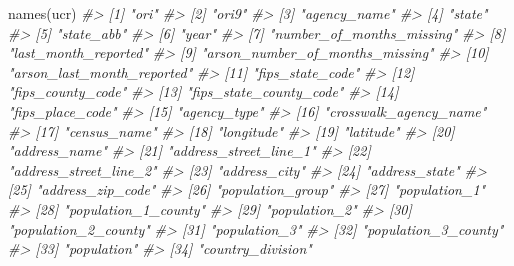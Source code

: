 \documentclass[
]{krantz}
\makeatletter
\newenvironment{Shaded}{\begin{snugshade}}{\end{snugshade}}
\newcommand{\CommentTok}[1]{\textcolor[rgb]{0.37,0.37,0.37}{\textit{#1}}}
\newcommand{\FunctionTok}[1]{\textcolor[rgb]{0,0,0}{#1}}
\newcommand{\NormalTok}[1]{#1}
\newenvironment{kframe}{%
\medskip{}
\setlength{\fboxsep}{.8em}
 \def\at@end@of@kframe{}%
 \ifinner\ifhmode%
  \def\at@end@of@kframe{\end{minipage}}%
  \begin{minipage}{\columnwidth}%
 \fi\fi%
 \def\FrameCommand##1{\hskip\@totalleftmargin \hskip-\fboxsep
 \colorbox{shadecolor}{##1}\hskip-\fboxsep
     \hskip-\linewidth \hskip-\@totalleftmargin \hskip\columnwidth}%
 \MakeFramed {\advance\hsize-\width
   \@totalleftmargin\z@ \linewidth\hsize
   \@setminipage}}%
 {\par\unskip\endMakeFramed%
 \at@end@of@kframe}
\renewenvironment{Shaded}{\begin{kframe}}{\end{kframe}}
\makeatother
\begin{document}
\begin{Shaded}
\begin{Highlighting}[]
\FunctionTok{names}\NormalTok{(ucr)}
\CommentTok{\#\textgreater{}   [1] "ori"                             }
\CommentTok{\#\textgreater{}   [2] "ori9"                            }
\CommentTok{\#\textgreater{}   [3] "agency\_name"                     }
\CommentTok{\#\textgreater{}   [4] "state"                           }
\CommentTok{\#\textgreater{}   [5] "state\_abb"                       }
\CommentTok{\#\textgreater{}   [6] "year"                            }
\CommentTok{\#\textgreater{}   [7] "number\_of\_months\_missing"        }
\CommentTok{\#\textgreater{}   [8] "last\_month\_reported"             }
\CommentTok{\#\textgreater{}   [9] "arson\_number\_of\_months\_missing"  }
\CommentTok{\#\textgreater{}  [10] "arson\_last\_month\_reported"       }
\CommentTok{\#\textgreater{}  [11] "fips\_state\_code"                 }
\CommentTok{\#\textgreater{}  [12] "fips\_county\_code"                }
\CommentTok{\#\textgreater{}  [13] "fips\_state\_county\_code"          }
\CommentTok{\#\textgreater{}  [14] "fips\_place\_code"                 }
\CommentTok{\#\textgreater{}  [15] "agency\_type"                     }
\CommentTok{\#\textgreater{}  [16] "crosswalk\_agency\_name"           }
\CommentTok{\#\textgreater{}  [17] "census\_name"                     }
\CommentTok{\#\textgreater{}  [18] "longitude"                       }
\CommentTok{\#\textgreater{}  [19] "latitude"                        }
\CommentTok{\#\textgreater{}  [20] "address\_name"                    }
\CommentTok{\#\textgreater{}  [21] "address\_street\_line\_1"           }
\CommentTok{\#\textgreater{}  [22] "address\_street\_line\_2"           }
\CommentTok{\#\textgreater{}  [23] "address\_city"                    }
\CommentTok{\#\textgreater{}  [24] "address\_state"                   }
\CommentTok{\#\textgreater{}  [25] "address\_zip\_code"                }
\CommentTok{\#\textgreater{}  [26] "population\_group"                }
\CommentTok{\#\textgreater{}  [27] "population\_1"                    }
\CommentTok{\#\textgreater{}  [28] "population\_1\_county"             }
\CommentTok{\#\textgreater{}  [29] "population\_2"                    }
\CommentTok{\#\textgreater{}  [30] "population\_2\_county"             }
\CommentTok{\#\textgreater{}  [31] "population\_3"                    }
\CommentTok{\#\textgreater{}  [32] "population\_3\_county"             }
\CommentTok{\#\textgreater{}  [33] "population"                      }
\CommentTok{\#\textgreater{}  [34] "country\_division"                }

\end{Highlighting}
\end{Shaded}
\end{document}
